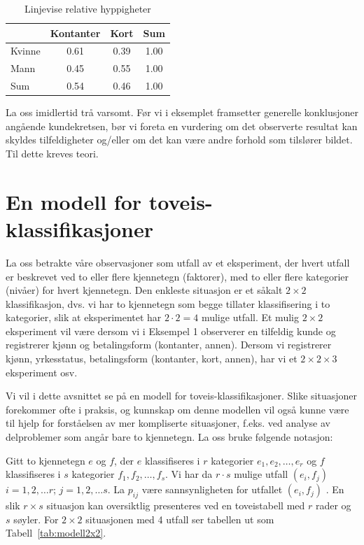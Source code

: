 \begin{table} \centering 
\begin{tabular}{l|cc|c}
       & Kontanter & Kort & Sum \\ \hline
Kvinne &   0.61    & 0.39 & 1.00 \\ 
Mann   &   0.45    & 0.55 & 1.00 \\ \hline
Sum    &   0.54    & 0.46 & 1.00 \\ \hline
\end{tabular}
\caption{Linjevise relative hyppigheter}
\label{tab:linjevise} %
\end{table}


La oss imidlertid trå varsomt. Før vi i eksemplet framsetter
generelle konklusjoner angående kundekretsen, bør vi foreta en
vurdering om det observerte resultat kan skyldes tilfeldigheter og/eller
om det kan være andre forhold som tilslører bildet.  Til dette
kreves teori. 

\section{En modell for toveis-klassifikasjoner}

La oss betrakte våre observasjoner som utfall av et eksperiment, der
hvert utfall er beskrevet ved to eller flere kjennetegn (faktorer), med 
to eller flere kategorier (nivåer) for hvert kjennetegn.
Den enkleste situasjon er et såkalt $2\times 2$ klassifikasjon, dvs.
vi har to kjennetegn som begge tillater klassifisering i to kategorier,
slik at eksperimentet har $2\cdot 2=4$ mulige utfall. 
Et mulig $2\times 2$ eksperiment vil være dersom vi i Eksempel 1
observerer en tilfeldig kunde og registrerer kjønn og betalingsform
(kontanter, annen).  Dersom vi registrerer kjønn, yrkesstatus,
betalingsform (kontanter, kort, annen), har vi et $2\times 2\times 3$
eksperiment osv.

Vi vil i dette avsnittet se på en modell for toveis-klassifikasjoner.
Slike situasjoner forekommer ofte i praksis, og kunnskap om denne modellen
vil også kunne være til hjelp for forståelsen av mer kompliserte
situasjoner, f.eks. ved analyse av delproblemer som angår bare to
kjennetegn. La oss bruke følgende notasjon:

Gitt to kjennetegn $e$ og $f$, der $e$ klassifiseres i $r$ kategorier 
$e_1,e_2,\ldots ,e_r$ og $f$ klassifiseres i $s$ kategorier 
$f_1,f_2,\ldots ,f_s$. Vi har da $r\cdot s$ mulige utfall $(e_i,f_j)$
$i=1,2,\ldots r$; $j=1,2,\ldots s$. La $p_{ij}$ være sannsynligheten
for utfallet $(e_i,f_j)$ . En slik $r\times s$ situasjon kan oversiktlig
presenteres ved en toveistabell med $r$ rader og $s$ søyler.
For $2\times 2$ situasjonen med 4 utfall ser tabellen ut som Tabell~\ref{tab:modell2x2}.

